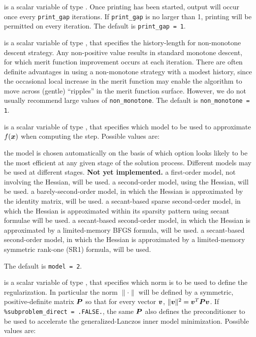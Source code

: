 \documentclass{galahad}
\begin{document}
\begin{description}
 is a scalar variable of type \integer.
Once printing has been started, output will occur once every
{\tt print\_gap} iterations. If {\tt print\_gap} is no larger than 1,
printing will be permitted on every iteration.
The default is {\tt print\_gap = 1}.

 is a scalar variable of type \integer, that
specifies the history-length for non-monotone descent strategy.
Any non-positive value results in standard monotone descent, for which
merit function improvement occurs at each iteration. There are often
definite advantages in using a non-monotone strategy with a modest history,
since the occasional local increase in the merit function may
enable the algorithm to move across (gentle) ``ripples'' in
the merit function surface.
However, we do not usually recommend large values of {\tt non\_monotone}.
The default is {\tt non\_monotone = 1}.

 is a scalar variable of type \integer, that specifies
which model to be used to approximate $f({\bm{x}})$ when computing the step.
Possible values are:

\begin{description}
 the model is chosen automatically on the basis of which option looks
        likely to be the most efficient at any given stage of the solution
        process. Different models may be used at different stages.
        {\bf Not yet implemented.}
 a first-order model, not involving the Hessian, will be used.
 a second-order model, using the Hessian, will be used.
 a barely-second-order model, in which the Hessian is approximated
        by the identity matrix, will be used.
 a secant-based sparse second-order model, in which the Hessian is
        approximated within its sparsity pattern using secant formulae will
        be used.
 a secant-based second-order model, in which the Hessian is approximated
        by a limited-memory BFGS formula, will be used.
 a secant-based second-order model, in which the Hessian is approximated
        by a limited-memory symmetric rank-one (SR1) formula, will be used.
\end{description}
The default is {\tt model = 2}.

 is a scalar variable of type \integer,
that specifies which norm is to be used to define the regularization.
In particular the norm $\|\cdot\|$ will be defined by a symmetric,
positive-definite matrix ${\bm{P}}$ so that for every vector ${\bm{v}}$,
$\|{\bm{v}}\|^2 = {\bm{v}}^T {\bm{P}} {\bm{v}}$.
If {\tt \%subproblem\_direct = .FALSE.}, the same ${\bm{P}}$ also defines the
preconditioner to be used to accelerate the generalized-Lanczos
inner model minimization.  Possible values are:


\end{description}
\end{document}
